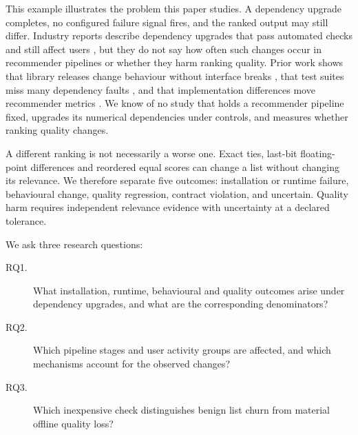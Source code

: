 \documentclass[11pt,a4paper]{article}
\begin{document}
This example illustrates the problem this paper studies. A dependency
upgrade completes, no configured failure signal fires, and the ranked output
may still differ. Industry reports describe dependency upgrades that pass
automated checks and still affect users \citep{singer2026spotify}, but they
do not say how often such changes occur in recommender pipelines or whether
they harm ranking quality. Prior work shows that library releases change
behaviour without interface breaks \citep{montandon2025dabc}, that test suites
miss many dependency faults \citep{hejderup2022trust,jayasuriya2024behavioral},
and that implementation differences move recommender metrics
\citep{hidasi2023thirdparty,schmidt2024itemknn,milogradskii2024bpr}. We know of
no study that holds a recommender pipeline fixed, upgrades its numerical
dependencies under controls, and measures whether ranking quality changes.

A different ranking is not necessarily a worse one. Exact ties, last-bit
floating-point differences and reordered equal scores can change a list
without changing its relevance. We therefore separate five outcomes:
installation or runtime failure, behavioural change, quality regression,
contract violation, and uncertain. Quality harm requires independent relevance
evidence with uncertainty at a declared tolerance.

We ask three research questions:
\begin{description}
  \item[RQ1.] What installation, runtime, behavioural and quality outcomes
    arise under dependency upgrades, and what are the corresponding denominators?
  \item[RQ2.] Which pipeline stages and user activity groups are affected,
    and which mechanisms account for the observed changes?
  \item[RQ3.] Which inexpensive check distinguishes benign list churn from
    material offline quality loss?
\end{description}
\end{document}
